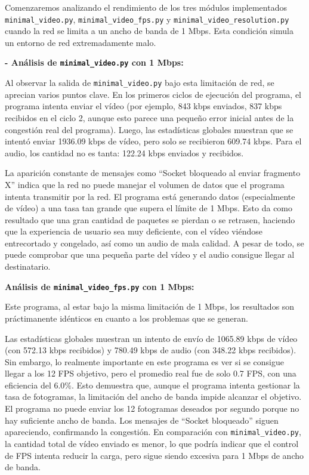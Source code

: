 Comenzaremos analizando el rendimiento de los tres módulos implementados \texttt{minimal\_video.py}, \texttt{minimal\_video\_fps.py} y \texttt{minimal\_video\_resolution.py} cuando la red se limita a un ancho de banda de 1 Mbps. Esta condición simula un entorno de red extremadamente malo.

\vspace{\baselineskip}

\textbf{- Análisis de \texttt{minimal\_video.py} con 1 Mbps:}
\vspace{\baselineskip}

Al observar la salida de \texttt{minimal\_video.py} bajo esta limitación de red, se aprecian varios puntos clave. En los primeros ciclos de ejecución del programa, el programa intenta enviar el vídeo (por ejemplo, 843 kbps enviados, 837 kbps recibidos en el ciclo 2, aunque esto parece una pequeño error inicial antes de la congestión real del programa). Luego, las estadísticas globales muestran que se intentó enviar 1936.09 kbps de vídeo, pero solo se recibieron 609.74 kbps. Para el audio, los cantidad no es tanta: 122.24 kbps enviados y recibidos.

La aparición constante de mensajes como ``Socket bloqueado al enviar fragmento X'' indica que la red no puede manejar el volumen de datos que el programa intenta transmitir por la red. El programa está generando datos (especialmente de vídeo) a una tasa tan grande que supera el límite de 1 Mbps. Esto da como resultado que una gran cantidad de paquetes se pierdan o se retrasen, haciendo que la experiencia de usuario sea muy deficiente, con el vídeo viéndose entrecortado y congelado, así como un audio de mala calidad. A pesar de todo, se puede comprobar que una pequeña parte del vídeo y el audio consigue llegar al destinatario.

\vspace{\baselineskip}

\textbf{Análisis de \texttt{minimal\_video\_fps.py} con 1 Mbps:}
\vspace{\baselineskip}

Este programa, al estar bajo la misma limitación de 1 Mbps, los resultados son práctimanente idénticos en cuanto a los problemas que se generan. 
\vspace{\baselineskip}

Las estadísticas globales muestran un intento de envío de 1065.89 kbps de vídeo (con 572.13 kbps recibidos) y 780.49 kbps de audio (con 348.22 kbps recibidos). Sin embargo, lo realmente importante en este programa es ver si se consigue llegar a los 12 FPS objetivo, pero el promedio real fue de solo 0.7 FPS, con una eficiencia del 6.0\%. Esto demuestra que, aunque el programa intenta gestionar la tasa de fotogramas, la limitación del ancho de banda impide alcanzar el objetivo. El programa no puede enviar los 12 fotogramas deseados por segundo porque no hay suficiente ancho de banda. Los mensajes de ``Socket bloqueado'' siguen apareciendo, confirmando la congestión. En comparación con \texttt{minimal\_video.py}, la cantidad total de vídeo enviado es menor, lo que podría indicar que el control de FPS intenta reducir la carga, pero sigue siendo excesiva para 1 Mbps de ancho de banda.

